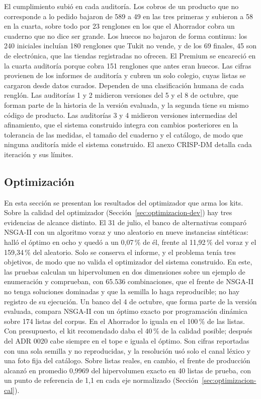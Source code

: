 El cumplimiento subió en cada auditoría. Los cobros de un producto que no corresponde a lo pedido
bajaron de 589 a 49 en las tres primeras y subieron a 58 en la cuarta, sobre todo por 23 renglones
en los que el Ahorrador cobra un cuaderno que no dice ser grande. Los huecos no bajaron de forma
continua: los 240 iniciales incluían 180 renglones que Tukit no vende, y de los 69 finales, 45 son
de electrónica, que las tiendas registradas no ofrecen. El Premium se encareció en la cuarta
auditoría porque cobra 151 renglones que antes eran huecos. Las cifras provienen de los informes de
auditoría y cubren un solo colegio, cuyas listas se cargaron desde datos curados. Dependen de una
clasificación humana de cada renglón. Las auditorías 1 y 2 midieron versiones del 5 y el 8 de
octubre, que forman parte de la historia de la versión evaluada, y la segunda tiene su mismo código
de producto. Las auditorías 3 y 4 midieron versiones intermedias del afinamiento, que el sistema
construido integra con cambios posteriores en la tolerancia de las medidas, el tamaño del cuaderno
y el catálogo, de modo que ninguna auditoría mide el sistema construido. El anexo
CRISP-DM detalla cada iteración y sus límites.

\subsection{Optimización}
\label{sec:optimizacion}

En esta sección se presentan los resultados del optimizador que arma los kits. Sobre la calidad del optimizador (Sección~\ref{sec:optimizacion-dev}) hay tres evidencias de
alcance distinto. El 31 de julio, el banco de alternativas comparó NSGA-II con un algoritmo voraz y
uno aleatorio en nueve instancias sintéticas: halló el óptimo en ocho y quedó a un 0,07\,\% de él,
frente al 11,92\,\% del voraz y el 159,34\,\% del aleatorio. Solo se conserva el informe, y el
problema tenía tres objetivos, de modo que no valida el optimizador del sistema construido. En este,
las pruebas calculan un hipervolumen \citep{zitzler_multiobjective_1999} en dos dimensiones sobre un
ejemplo de enumeración y comprueban, con 65.536 combinaciones, que el frente de NSGA-II no tenga
soluciones dominadas y que la semilla lo haga reproducible; no hay registro de su ejecución. Un
banco del 4 de octubre, que forma parte de la versión evaluada, compara NSGA-II con un óptimo exacto
por programación dinámica sobre 174 listas del corpus. En el Ahorrador lo iguala en el 100\,\% de
las listas. Con presupuesto, el kit recomendado daba el 40\,\% de la calidad posible; después del
ADR 0020 cabe siempre en el tope e iguala el óptimo. Son cifras reportadas con una sola semilla y no
reproducidas, y la resolución usó solo el canal léxico y una foto fija del catálogo. Sobre listas reales, en cambio, el frente de producción
alcanzó en promedio 0,9969 del hipervolumen exacto en 40 listas de prueba, con un punto de referencia
de 1,1 en cada eje normalizado (Sección~\ref{sec:optimizacion-cal}).

